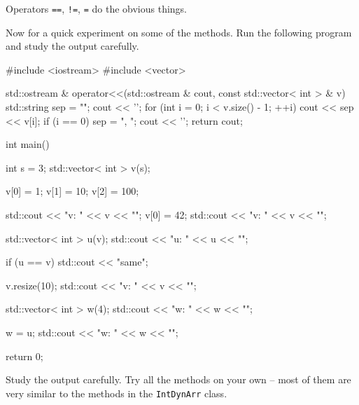 Operators \texttt{==}, \texttt{!=}, \texttt{=} do the obvious things.

Now for a quick experiment on some of the methods. Run the following
program and study the output carefully.

\begin{console}
#include <iostream>
#include <vector>

std::ostream & operator<<(std::ostream & cout,
               const std::vector< int > & v)
{     
      std::string sep = "";
      cout << '{';
      for (int i = 0; i < v.size() - 1; ++i)
      {   
          cout << sep << v[i];
          if (i == 0) sep = ", ";
      }
      cout << '}';
      return cout;
}

int main()
{   
    int s = 3;
    std::vector< int > v(s);
    
    v[0] = 1; v[1] = 10; v[2] = 100;

    std::cout << "v: " << v << "\n";
    v[0] = 42;
    std::cout << "v: " << v << "\n";

    std::vector< int > u(v);
    std::cout << "u: " << u << "\n";

    if (u == v)
    {  
       std::cout << "same\n";
    }

    v.resize(10);
    std::cout << "v: " << v << "\n";

    std::vector< int > w(4);
    std::cout << "w: " << w << "\n";

    w = u;
    std::cout << "w: " << w << "\n";

    return 0;
}
\end{console}

Study the output carefully. Try all the methods on your own -- most of
them are very similar to the methods in the \texttt{IntDynArr} class.

